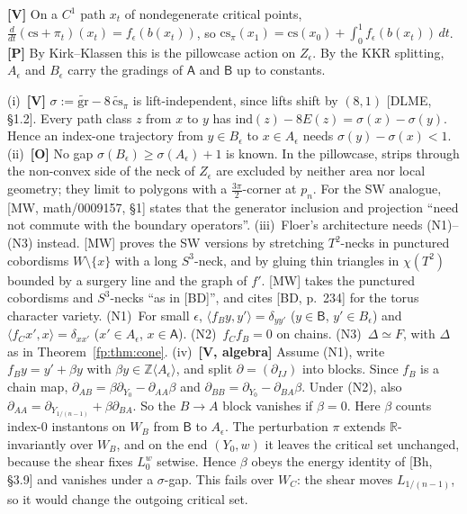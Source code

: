 \begin{remark}[levels]\label{fp:rem:levels}
\textbf{[V]} On a $C^1$ path $x_t$ of nondegenerate critical points, $\frac{d}{dt}(\mathrm{cs}+\pi_t)(x_t)=f_\epsilon(b(x_t))$, so
$\mathrm{cs}_\pi(x_1)=\mathrm{cs}(x_0)+\int_0^1f_\epsilon(b(x_t))\,dt$.  \textbf{[P]} By Kirk--Klassen this is the pillowcase action
on $Z_\epsilon$.  By the KKR splitting, $A_\epsilon$ and $B_\epsilon$ carry the gradings of $\mathsf A$ and $\mathsf B$ up to constants.
\end{remark}

\begin{proposition}\label{fp:prop:crux}
(i)~\textbf{[V]} $\sigma:=\widetilde{\mathrm{gr}}-8\,\widetilde{\mathrm{cs}}_\pi$ is lift-independent, since lifts shift by $(8,1)$
[DLME, \S1.2].  Every path class $z$ from $x$ to $y$ has $\mathrm{ind}(z)-8E(z)=\sigma(x)-\sigma(y)$.  Hence an
index-one trajectory from $y\in B_\epsilon$ to $x\in A_\epsilon$ needs $\sigma(y)-\sigma(x)<1$.
(ii)~\textbf{[O]} No gap $\sigma(B_\epsilon)\ge\sigma(A_\epsilon)+1$ is known.  In the pillowcase, strips through the
non-convex side of the neck of $Z_\epsilon$ are excluded by neither area nor local geometry; they limit to polygons with
a $\frac{3\pi}2$-corner at $p_n$.  For the SW analogue, [MW, math/0009157, \S1] states that the generator inclusion and
projection ``need not commute with the boundary operators''.
(iii)~Floer's architecture needs (N1)--(N3) instead.  [MW] proves the SW versions by stretching $T^2$-necks in
punctured cobordisms $W\setminus\{x\}$ with a long $S^3$-neck, and by gluing thin triangles in $\chi(T^2)$ bounded by a
surgery line and the graph of $f'$.  [MW] takes the punctured cobordisms and $S^3$-necks ``as in [BD]'', and cites
[BD, p.~234] for the torus character variety.
(N1)~For small $\epsilon$, $\langle f_By,y'\rangle=\delta_{yy'}$ ($y\in\mathsf B$, $y'\in B_\epsilon$) and
$\langle f_Cx',x\rangle=\delta_{xx'}$ ($x'\in A_\epsilon$, $x\in\mathsf A$).
(N2)~$f_Cf_B=0$ on chains.
(N3)~$\Delta\simeq F$, with $\Delta$ as in Theorem~\ref{fp:thm:cone}.
(iv)~\textbf{[V, algebra]} Assume (N1), write $f_By=y'+\beta y$ with $\beta y\in\mathbb Z\langle A_\epsilon\rangle$, and split
$\partial=(\partial_{IJ})$ into blocks.  Since $f_B$ is a chain map, $\partial_{AB}=\beta\partial_{Y_0}-\partial_{AA}\beta$ and
$\partial_{BB}=\partial_{Y_0}-\partial_{BA}\beta$.  Under (N2), also $\partial_{AA}=\partial_{Y_{1/(n-1)}}+\beta\partial_{BA}$.
So the $B\!\to\!A$ block vanishes if $\beta=0$.  Here $\beta$ counts index-$0$ instantons on $W_B$ from $\mathsf B$ to $A_\epsilon$.
The perturbation $\pi$ extends $\mathbb R$-invariantly over $W_B$, and on the end $(Y_0,w)$ it leaves the critical set
unchanged, because the shear fixes $L^w_0$ setwise.  Hence $\beta$ obeys the energy identity of [Bh, \S3.9] and
vanishes under a $\sigma$-gap.  This fails over $W_C$: the shear moves $L_{1/(n-1)}$, so it would change the outgoing
critical set.
\end{proposition}

